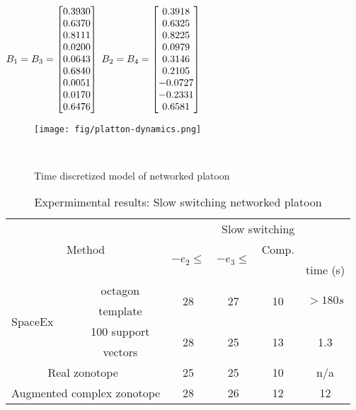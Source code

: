 \begin{table}
{$B_1=B_3=\left[\begin{matrix}0.3930\\
    0.6370\\
    0.8111\\
    0.0200\\
    0.0643\\
    0.6840\\
    0.0051\\
    0.0170\\
    0.6476\\
\end{matrix}\right]$
$B_2=B_4=\left[\begin{matrix}0.3918\\
    0.6325\\
    0.8225\\
    0.0979\\
    0.3146\\
    0.2105\\
   -0.0727\\
   -0.2331\\
    0.6581\end{matrix}\right]$
}
\end{table}
%
%
\begin{figure}
\center
\texttt{[image: fig/platton-dynamics.png]}
\caption{Time discretized model of networked platoon}~\label{fig:model-platoon}
\end{figure}
%

\begin{table}
\begin{tabular}{|l|c|c|c|c|c|}
\hline
\multicolumn{2}{|c|}{\multirow{4}{*}{Method}} & \multicolumn{4}{|c|}{\multirow{2}{*}{Slow switching}}\\
\multicolumn{2}{|c|}{} & \multicolumn{4}{|c|}{}\\
\cline{3-6}
\multicolumn{2}{|c|}{} & \multirow{2}{*}{$-e_1\leq$} & \multirow{2}{*}{$-e_2\leq$} & \multirow{2}{*}{$-e_3\leq$} & Comp.\\
\multicolumn{2}{|c|}{} & & & & time (s)\\
\hline
\multirow{4}{*}{SpaceEx} & octagon & \multirow{2}{*}{28} &
\multirow{2}{*}{27} & \multirow{2}{*}{10}& \multirow{2}{*}{$>180s$}\\
& template & & & &\\
\cline{2-6}
& 100 support & \multirow{2}{*}{28} & \multirow{2}{*}{25} &
\multirow{2}{*}{13} & \multirow{2}{*}{1.3}\\
& vectors & & & &\\
\hline
\multicolumn{2}{|c|}{\multirow{2}{*}{Real zonotope~\cite{makhlouf2014networked}}} &
\multirow{2}{*}{25} & \multirow{2}{*}{25} & \multirow{2}{*}{10} & \multirow{2}{*}{n/a}\\
\multicolumn{2}{|c|}{} & & & &\\
\hline
\multicolumn{2}{|c|}{\multirow{2}{*}{Augmented complex zonotope}} &
\multirow{2}{*}{28} & \multirow{2}{*}{26} &
\multirow{2}{*}{12} & \multirow{2}{*}{12}\\
\multicolumn{2}{|c|}{} & & & & \\
\hline
\end{tabular}
\caption{Expermimental results: Slow switching networked platoon}~\label{tab:largedwell-platoon}
%
\end{table}

